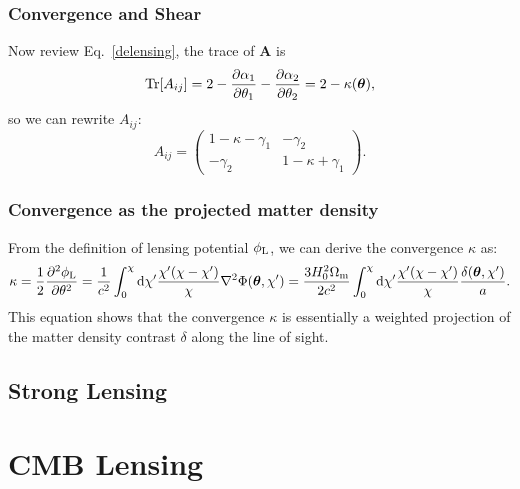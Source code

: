 \subsubsection{Convergence and Shear}
Now review Eq.~\ref{delensing}, the trace of $\mathbf{A}$ is
\[
    \operatorname{Tr}[A_{ij}] = 2-\dfrac{\partial \alpha_1}{\partial \theta_1} - \dfrac{\partial \alpha_2}{\partial \theta_2} = 2-\kappa(\boldsymbol{\theta}),
\]
so we can rewrite $A_{ij}$:
\begin{equation}
    A_{ij} = \begin{pmatrix}
        1-\kappa -\gamma_1 & -\gamma_2 \\ -\gamma_2 & 1-\kappa +\gamma_1
    \end{pmatrix}.
\end{equation}

\subsubsection{Convergence as the projected matter density}
From the definition of lensing potential $\phi_{\rm L}$, we can derive the convergence $\kappa$ as:
\begin{equation}
    \kappa = \dfrac{1}{2}\dfrac{\partial ^2\phi_{\rm L}}{\partial \theta^2} = \dfrac{1}{c^2}\int_0^\chi \dd \chi' \dfrac{\chi'(\chi-\chi')}{\chi}\nabla^2 \Phi(\boldsymbol{\theta},\chi') = \dfrac{3H_0^2\Omega_{\rm m}}{2c^2}\int_0^\chi \dd \chi' \dfrac{\chi'(\chi-\chi')}{\chi}\dfrac{\delta(\boldsymbol{\theta},\chi')}{a}.
\end{equation}
This equation shows that the convergence $\kappa$ is essentially a weighted projection of the matter density contrast $\delta$ along the line of sight.



\subsection{Strong Lensing}

\section{CMB Lensing}